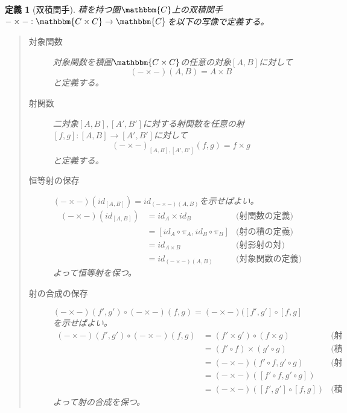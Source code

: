 \documentclass[uplatex,dvipdfmx]{jsarticle}
\newcommand{\cat}[1]{\mathbbm{#1}}
\newcommand{\arrow}{\rightarrow}
\newcommand{\functor}[3]{#1:\cat{#2}\arrow \cat{#3}}
\newcommand{\mor}[3]{#1:#2\arrow #3}
\newcommand{\pcobj}[1]{[#1]}
\newtheorem{define}{定義}[section]
\numberwithin{proof}{subsection}
\numberwithin{prop}{subsection}
\numberwithin{define}{subsection}
\begin{document}
	\begin{define}[双積関手]
		積を持つ圏$\cat{C}$上の双積関手$\functor{-\times -}{C\times C}{C}$を以下の写像で定義する。
		\begin{quote}
			\begin{description}
				\item[対象関数] 対象関数を積圏$\cat{C\times C}$の任意の対象$\pcobj{A,B}$に対して\[(-\times -)(A,B)=A\times B\]と定義する。
				\item[射関数] 二対象$\pcobj{A,B},\pcobj{A',B'}$に対する射関数を任意の射$\mor{\pcobj{f,g}}{\pcobj{A,B}}{\pcobj{A',B'}}$に対して\[(-\times -)_{\pcobj{A,B},\pcobj{A',B'}}(f,g)=f\times g\]と定義する。
				\begin{center}
				\end{center}

				\item[恒等射の保存] $(-\times -)(id_{\pcobj{A,B}})=id_{(-\times-)(A,B)}$を示せばよい。
				\begin{align*}
					(-\times -)(id_{\pcobj{A,B}})&=id_A\times id_B&\text{(射関数の定義)}\\
					&=\pcobj{id_A\circ\pi_A,id_B\circ\pi_B}&\text{(射の積の定義)}\\
					&=id_{A\times B}&\text{(射影射の対)}\\
					&=id_{(-\times-)(A,B)}&\text{(対象関数の定義)}
				\end{align*}
				よって恒等射を保つ。
				\item[射の合成の保存] $(-\times -)(f',g')\circ(-\times-)(f,g)=(-\times-)(\pcobj{f',g'}\circ\pcobj{f,g}$を示せばよい。
				\begin{align*}
					(-\times -)(f',g')\circ(-\times-)(f,g)&=(f'\times g')\circ(f\times g)&\text{(射関数の定義)}\\
					&=(f'\circ f)\times(g'\circ g)&\text{(積と合成の交換)}\\
					&=(-\times-)(f'\circ f,g'\circ g)&\text{(射関数の定義)}\\
					&=(-\times-)(\pcobj{f'\circ f,g'\circ g})\\
					&=(-\times-)(\pcobj{f',g'}\circ\pcobj{f,g})&\text{(積圏の射の合成の定義)}
				\end{align*}
				よって射の合成を保つ。
			\end{description}
		\end{quote}
	\end{define}
\end{document}
